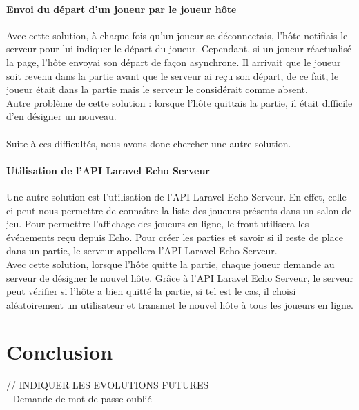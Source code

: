 \documentclass{tnreport}
\begin{document}
\subsubsection{Envoi du départ d'un joueur par le joueur hôte}
Avec cette solution, à chaque fois qu'un joueur se déconnectais, l'hôte notifiais le serveur pour lui indiquer le départ du joueur. Cependant, si un joueur réactualisé la page, l'hôte envoyai son départ de façon asynchrone. Il arrivait que le joueur soit revenu dans la partie avant que le serveur ai reçu son départ, de ce fait, le joueur était dans la partie mais le serveur le considérait comme absent.\\
Autre problème de cette solution : lorsque l'hôte quittais la partie, il était difficile d'en désigner un nouveau.\\
\\
Suite à ces difficultés, nous avons donc chercher une autre solution.
\subsubsection{Utilisation de l'API Laravel Echo Serveur}
Une autre solution est l'utilisation de l'API Laravel Echo Serveur. En effet, celle-ci peut nous permettre de connaître la liste des joueurs présents dans un salon de jeu. Pour permettre l'affichage des joueurs en ligne, le front utilisera les événements reçu depuis Echo. Pour créer les parties et savoir si il reste de place dans un partie, le serveur appellera l'API Laravel Echo Serveur.\\
Avec cette solution, lorsque l'hôte quitte la partie, chaque joueur demande au serveur de désigner le nouvel hôte. Grâce à l'API Laravel Echo Serveur, le serveur peut vérifier si l'hôte a bien quitté la partie, si tel est le cas, il choisi aléatoirement un utilisateur et transmet le nouvel hôte à tous les joueurs en ligne.\\

\cleardoublepage

\chapter{Conclusion}

// INDIQUER LES EVOLUTIONS FUTURES \\
 - Demande de mot de passe oublié

\cleardoublepage

\listoffigures

\cleardoublepage
\end{document}
